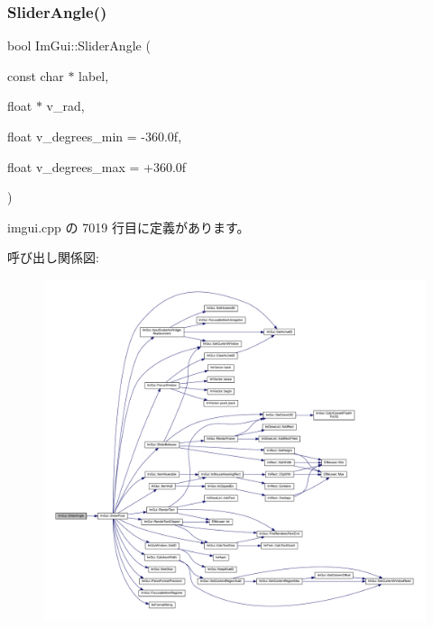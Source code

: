 \subsubsection{\texorpdfstring{Slider\+Angle()}{SliderAngle()}}
{\footnotesize\ttfamily bool Im\+Gui\+::\+Slider\+Angle (\begin{DoxyParamCaption}\item[{const char $\ast$}]{label,  }\item[{float $\ast$}]{v\+\_\+rad,  }\item[{float}]{v\+\_\+degrees\+\_\+min = {\ttfamily -\/360.0f},  }\item[{float}]{v\+\_\+degrees\+\_\+max = {\ttfamily +360.0f} }\end{DoxyParamCaption})}



 imgui.\+cpp の 7019 行目に定義があります。

呼び出し関係図\+:\nopagebreak
\begin{figure}[H]
\begin{center}
\leavevmode
\includegraphics[width=350pt]{namespace_im_gui_ad20170a9fff4ded0076476dad8ec6645_cgraph}
\end{center}
\end{figure}
\mbox{\label{namespace_im_gui_a3d3b2964eeba76dadaa532232c23fc97}} 
